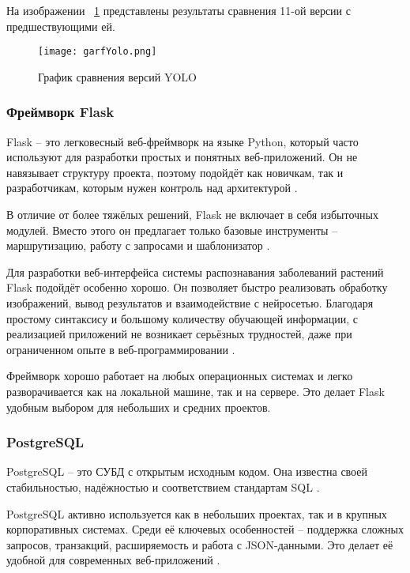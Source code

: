 На изображении ~\ref{graf:image} представлены результаты сравнения 11-ой версии с предшествующими ей. 

\begin{figure}[H]
	\centering
	\texttt{[image: garfYolo.png]}
	\caption{График сравнения версий YOLO}
	\label{graf:image}
\end{figure}

\subsubsection{Фреймворк Flask}

Flask -- это легковесный веб-фреймворк на языке Python, который часто используют для разработки простых и понятных веб-приложений. Он не навязывает структуру проекта, поэтому подойдёт как новичкам, так и разработчикам, которым нужен контроль над архитектурой \cite{flask1}.

В отличие от более тяжёлых решений, Flask не включает в себя избыточных модулей. Вместо этого он предлагает только базовые инструменты -- маршрутизацию, работу с запросами и шаблонизатор \cite{flask2}.

Для разработки веб-интерфейса системы распознавания заболеваний растений Flask подойдёт особенно хорошо. Он позволяет быстро реализовать обработку изображений, вывод результатов и взаимодействие с нейросетью. Благодаря простому синтаксису и большому количеству обучающей информации, с реализацией приложений не возникает серьёзных трудностей, даже при ограниченном опыте в веб-программировании \cite{flask4}.

Фреймворк хорошо работает на любых операционных системах и легко разворачивается как на локальной машине, так и на сервере. Это делает Flask удобным выбором для небольших и средних проектов.

\subsubsection{PostgreSQL}

PostgreSQL -- это СУБД с открытым исходным кодом. Она известна своей стабильностью, надёжностью и соответствием стандартам SQL \cite{postgres1}.

PostgreSQL активно используется как в небольших проектах, так и в крупных корпоративных системах. Среди её ключевых особенностей -- поддержка сложных запросов, транзакций, расширяемость и работа с JSON-данными. Это делает её удобной для современных веб-приложений \cite{postgres2}.

